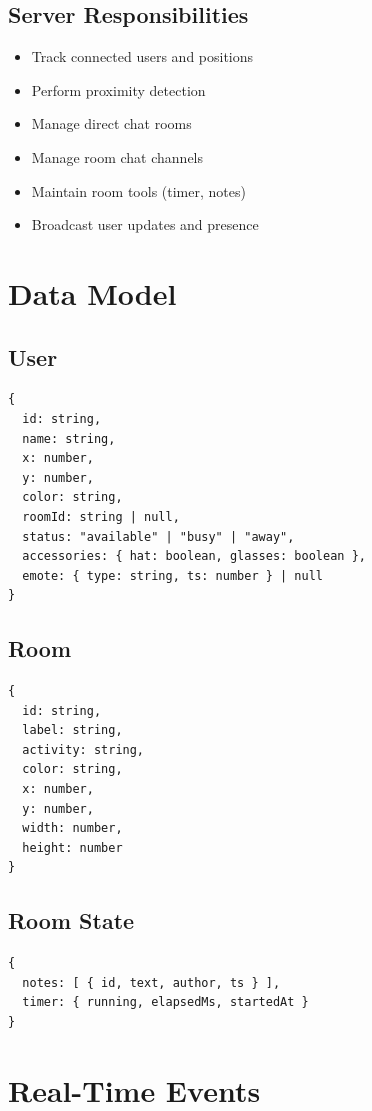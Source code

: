 \documentclass[11pt]{article}
\begin{document}
\subsection{Server Responsibilities}
\begin{itemize}[leftmargin=*]
  \item Track connected users and positions
  \item Perform proximity detection
  \item Manage direct chat rooms
  \item Manage room chat channels
  \item Maintain room tools (timer, notes)
  \item Broadcast user updates and presence
\end{itemize}

\section{Data Model}
\subsection{User}
\begin{lstlisting}
{
  id: string,
  name: string,
  x: number,
  y: number,
  color: string,
  roomId: string | null,
  status: "available" | "busy" | "away",
  accessories: { hat: boolean, glasses: boolean },
  emote: { type: string, ts: number } | null
}
\end{lstlisting}

\subsection{Room}
\begin{lstlisting}
{
  id: string,
  label: string,
  activity: string,
  color: string,
  x: number,
  y: number,
  width: number,
  height: number
}
\end{lstlisting}

\subsection{Room State}
\begin{lstlisting}
{
  notes: [ { id, text, author, ts } ],
  timer: { running, elapsedMs, startedAt }
}
\end{lstlisting}

\section{Real-Time Events}
\end{document}
